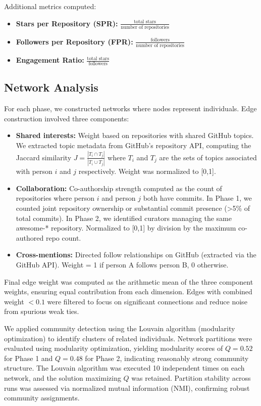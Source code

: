 \documentclass[11pt]{article}
\begin{document}
Additional metrics computed:
\begin{itemize}
    \item \textbf{Stars per Repository (SPR):} $\frac{\text{total stars}}{\text{number of repositories}}$
    \item \textbf{Followers per Repository (FPR):} $\frac{\text{followers}}{\text{number of repositories}}$
    \item \textbf{Engagement Ratio:} $\frac{\text{total stars}}{\text{followers}}$
\end{itemize}

\subsection{Network Analysis}

For each phase, we constructed networks where nodes represent individuals. Edge construction involved three components:

\begin{itemize}
    \item \textbf{Shared interests:} Weight based on repositories with shared GitHub topics. We extracted topic metadata from GitHub's repository API, computing the Jaccard similarity $J = \frac{|T_i \cap T_j|}{|T_i \cup T_j|}$ where $T_i$ and $T_j$ are the sets of topics associated with person $i$ and $j$ respectively. Weight was normalized to [0,1].

    \item \textbf{Collaboration:} Co-authorship strength computed as the count of repositories where person $i$ and person $j$ both have commits. In Phase 1, we counted joint repository ownership or substantial commit presence (>5\% of total commits). In Phase 2, we identified curators managing the same awesome-* repository. Normalized to [0,1] by division by the maximum co-authored repo count.

    \item \textbf{Cross-mentions:} Directed follow relationships on GitHub (extracted via the GitHub API). Weight = 1 if person A follows person B, 0 otherwise.
\end{itemize}

Final edge weight was computed as the arithmetic mean of the three component weights, ensuring equal contribution from each dimension. Edges with combined weight $< 0.1$ were filtered to focus on significant connections and reduce noise from spurious weak ties.

We applied community detection using the Louvain algorithm (modularity optimization) to identify clusters of related individuals. Network partitions were evaluated using modularity optimization, yielding modularity scores of $Q = 0.52$ for Phase 1 and $Q = 0.48$ for Phase 2, indicating reasonably strong community structure. The Louvain algorithm was executed 10 independent times on each network, and the solution maximizing $Q$ was retained. Partition stability across runs was assessed via normalized mutual information (NMI), confirming robust community assignments.
\end{document}

